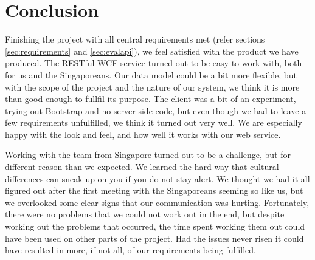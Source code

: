 \section{Conclusion}
Finishing the project with all central requirements met (refer sections
\ref{sec:requirements} and \ref{sec:evalapi}), we feel satisfied with the product
we have produced. 
The RESTful WCF service turned out to be easy to work with,
both for us and the Singaporeans. Our data model could be a bit more flexible, but
with the scope of the project and the nature of our system, we think it is more than good
enough to fullfil its purpose.
The client was a bit of an experiment, trying out Bootstrap and no server side code,
but even though we had to leave a few requirements unfulfilled, we think it 
turned out very well. We are especially happy with the look and feel, and how well it works with our web service.

Working with the team from Singapore turned out to be a challenge, but for 
different reason than we expected. We learned the hard way that 
cultural differences can sneak up on you if you do not stay alert. We
thought we had it all figured out after the first meeting with the Singaporeans
seeming so like us, but we overlooked some clear signs that our communication
was hurting.
Fortunately, there were no problems that we could not work out in the end, but
despite working out the problems that occurred, the time spent working them out
could have been used on other parts of the project. 
Had the issues never risen it could have resulted in more, if not all, of our requirements being fulfilled.


